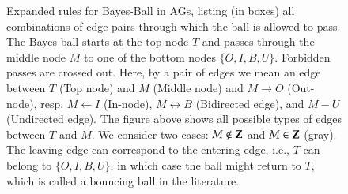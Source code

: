 \def\bayesball#1#2#3#4#5#6#7#8{\begin{scope}[xshift=#1]
\node[] (C) at (0,1) {T}; 
\node[#2] (M) {$M$}; 
\draw[#3] (C) -- (M);
\node[] (O) at (-0.9,-1) {$O$} ; \draw[#4,->] (M) -- (O);
\node[] (I) at (-0.3,-1) {$I$} ; \draw[#5,<-] (M) -- (I);
\node[] (B) at (0.3,-1) {$B$}  ; \draw[#6,<->] (M) -- (B);
\node[] (U) at (0.9,-1) {$U$}  ; \draw[#7] (M) -- (U);
\node[text width=2em,anchor=north,draw] at (-0.9,1.2) {#8};
\end{scope}}
\begin{figure}
\centering
{}
\caption{Expanded rules for Bayes-Ball in AGs, listing (in boxes) 
all combinations of edge pairs through which the ball is allowed to pass. 
The Bayes ball starts at the top node $ T $ and passes through the middle 
node $ M $ to one of the bottom nodes $\{O,I,B,U\}$. Forbidden passes are crossed out.
Here, by a pair of edges we mean an edge between $T$ (Top node) and $M$ (Middle node) 
and $M\to O$ (Out-node), resp. $M\gets I$ (In-node), $M\leftrightarrow  B$ (Bidirected edge), and  $M-U$ (Undirected edge).
The figure above shows all possible types of edges between $T$ and $M$.
We consider two cases: $M\not\in {\bf Z}$ and $M\in {\bf Z}$ (gray). 
The leaving edge can correspond to the entering edge, i.e., $T$
can belong to $\{O,I,B,U\}$, in which case the ball might return to $T$, which is called a bouncing ball in the literature.}\label{fig:bayes:ball}
\end{figure}


